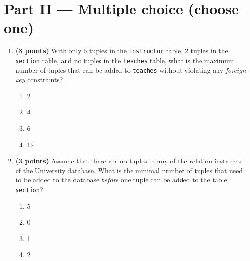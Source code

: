 \documentclass{article}
\begin{document}
\section*{Part II — Multiple choice (choose one)}
\begin{enumerate}
  \item \textbf{(3 points)} With only 6 tuples in the \texttt{instructor} table, 2 tuples in the \texttt{section} table, and no tuples in the \texttt{teaches} table, what is the maximum number of tuples that can be added to \texttt{teaches} without violating any \emph{foreign key} constraints?
  \begin{enumerate}
    \item[(A)] 2
    \item[(B)] 4
    \item[(C)] 6
    \item[(D)] 12
  \end{enumerate}
  \item \textbf{(3 points)} Assume that there are no tuples in any of the relation instances of the University database. What is the minimal number of tuples that need to be added to the database \emph{before} one tuple can be added to the table \texttt{section}?
  \begin{enumerate}
    \item[(A)] 5
    \item[(B)] 0
    \item[(C)] 1
    \item[(D)] 2
  \end{enumerate}
\end{enumerate}
\end{document}
